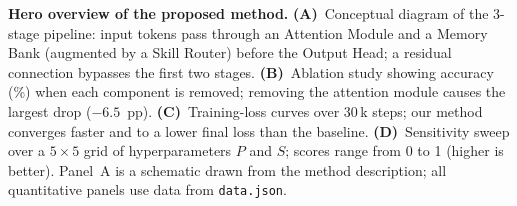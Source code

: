\caption{\textbf{Hero overview of the proposed method.}
\textbf{(A)}~Conceptual diagram of the 3-stage pipeline: input tokens pass through an Attention Module and a Memory Bank (augmented by a Skill Router) before the Output Head; a residual connection bypasses the first two stages.
\textbf{(B)}~Ablation study showing accuracy (\%) when each component is removed; removing the attention module causes the largest drop ($-6.5$~pp).
\textbf{(C)}~Training-loss curves over 30\,k steps; our method converges faster and to a lower final loss than the baseline.
\textbf{(D)}~Sensitivity sweep over a $5{\times}5$ grid of hyperparameters $P$ and $S$; scores range from 0 to 1 (higher is better).
Panel~A is a schematic drawn from the method description; all quantitative panels use data from \texttt{data.json}.}
